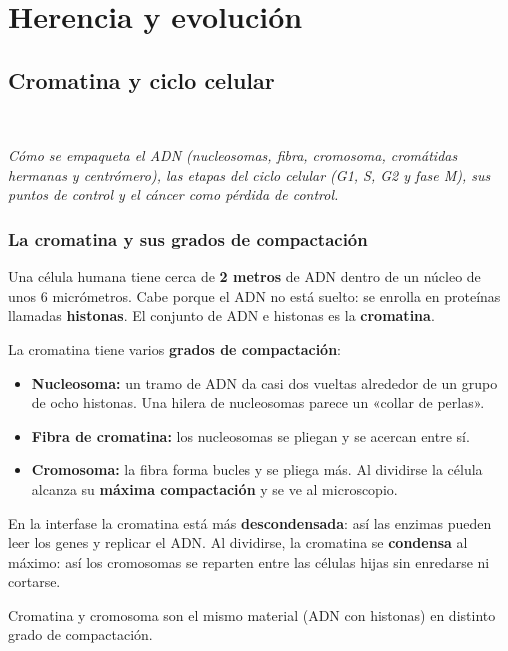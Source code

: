 \chapter{Herencia y evolución}
\section[Cromatina y ciclo celular]{Cromatina y ciclo celular}
\modcomun\ \ {\color{gris}\itshape Cómo se empaqueta el ADN (nucleosomas, fibra, cromosoma, cromátidas hermanas y centrómero), las etapas del ciclo celular (G1, S, G2 y fase M), sus puntos de control y el cáncer como pérdida de control.\par}
\subsection{La cromatina y sus grados de compactación}
Una célula humana tiene cerca de \textbf{2 metros} de ADN dentro de un núcleo de unos 6 micrómetros. Cabe porque el ADN no está suelto: se enrolla en proteínas llamadas \textbf{histonas}. El conjunto de ADN e histonas es la \textbf{cromatina}.

 

La cromatina tiene varios \textbf{grados de compactación}:

 
\begin{itemize}
  \item \textbf{Nucleosoma:} un tramo de ADN da casi dos vueltas alrededor de un grupo de ocho histonas. Una hilera de nucleosomas parece un «collar de perlas».
  \item \textbf{Fibra de cromatina:} los nucleosomas se pliegan y se acercan entre sí.
  \item \textbf{Cromosoma:} la fibra forma bucles y se pliega más. Al dividirse la célula alcanza su \textbf{máxima compactación} y se ve al microscopio.
\end{itemize}
  
\begin{clave} En la interfase la cromatina está más \textbf{descondensada}: así las enzimas pueden leer los genes y replicar el ADN. Al dividirse, la cromatina se \textbf{condensa} al máximo: así los cromosomas se reparten entre las células hijas sin enredarse ni cortarse.\end{clave}
 
\begin{clave}[{Recuerda}] Cromatina y cromosoma son el mismo material (ADN con histonas) en distinto grado de compactación.\end{clave}
  
